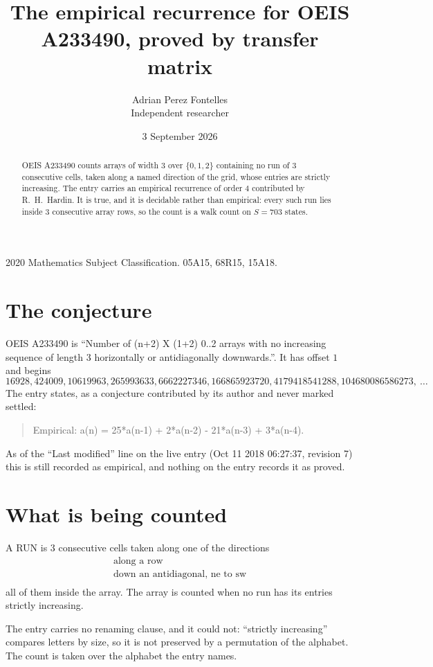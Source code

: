 \documentclass[11pt,a4paper]{article}
\title{The empirical recurrence for OEIS A233490, proved by transfer matrix}
\author{Adrian Perez Fontelles\\ \small Independent researcher}
\date{3 September 2026}
\theoremstyle{plain}
\theoremstyle{definition}
\begin{document}
\maketitle

\begin{abstract}
OEIS A233490 counts arrays of width $3$ over $\{0,1,2\}$ containing no run of $3$ consecutive
cells, taken along a named direction of the grid, whose entries are strictly increasing. The entry carries
an empirical recurrence of order $4$ contributed by R.~H.~Hardin. It is true, and it is
decidable rather than empirical: every such run lies inside $3$ consecutive array rows, so
the count is a walk count on $S=703$ states.
\end{abstract}

\noindent\small 2020 Mathematics Subject Classification. 05A15, 68R15, 15A18.\normalsize

\section{The conjecture}

OEIS A233490 is ``Number of (n+2) X (1+2) 0..2 arrays with no increasing sequence of length 3 horizontally or antidiagonally downwards.''. It has offset $1$ and begins
\[
16928, 424009, 10619963, 265993633, 6662227346, 166865923720, 4179418541288, 104680086586273,\ \dots
\]
The entry states, as a conjecture contributed by its author and never marked settled:
\begin{quote}
Empirical: a(n) = 25*a(n-1) + 2*a(n-2) - 21*a(n-3) + 3*a(n-4).
\end{quote}
As of the ``Last modified'' line on the live entry (Oct 11 2018 06:27:37, revision 7) this is still
recorded as empirical, and nothing on the entry records it as proved.

\section{What is being counted}

A RUN is $3$ consecutive cells taken along one of the directions
\[
\begin{array}{l}
\text{along a row} \\
\text{down an antidiagonal, ne to sw} \\
\end{array}
\]
all of them inside the array. The array is counted when no run has its entries strictly increasing.


The entry carries no renaming clause, and it could not: ``strictly increasing'' compares
letters by size, so it is not preserved by a permutation of the alphabet. The count is taken
over the alphabet the entry names.
\end{document}
